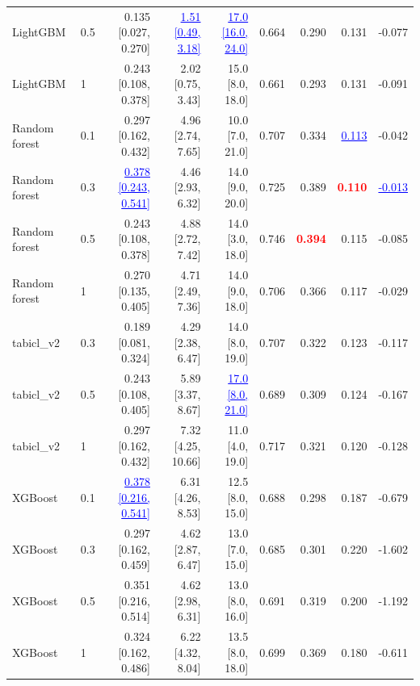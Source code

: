\begin{table}[!htbp]
{\begin{tabular}{llrrrrrrr}
LightGBM & 0.5 & 0.135 [0.027, 0.270] & \textcolor{blue}{\underline{1.51 [0.49, 3.18]}} & \textcolor{blue}{\underline{17.0 [16.0, 24.0]}} & 0.664 & 0.290 & 0.131 & -0.077 \\
LightGBM & 1 & 0.243 [0.108, 0.378] & 2.02 [0.75, 3.43] & 15.0 [8.0, 18.0] & 0.661 & 0.293 & 0.131 & -0.091 \\
Random forest & 0.1 & 0.297 [0.162, 0.432] & 4.96 [2.74, 7.65] & 10.0 [7.0, 21.0] & 0.707 & 0.334 & \textcolor{blue}{\underline{0.113}} & -0.042 \\
Random forest & 0.3 & \textcolor{blue}{\underline{0.378 [0.243, 0.541]}} & 4.46 [2.93, 6.32] & 14.0 [9.0, 20.0] & 0.725 & 0.389 & \textcolor{red}{\textbf{0.110}} & \textcolor{blue}{\underline{-0.013}} \\
Random forest & 0.5 & 0.243 [0.108, 0.378] & 4.88 [2.72, 7.42] & 14.0 [3.0, 18.0] & 0.746 & \textcolor{red}{\textbf{0.394}} & 0.115 & -0.085 \\
Random forest & 1 & 0.270 [0.135, 0.405] & 4.71 [2.49, 7.36] & 14.0 [9.0, 18.0] & 0.706 & 0.366 & 0.117 & -0.029 \\
tabicl\_v2 & 0.3 & 0.189 [0.081, 0.324] & 4.29 [2.38, 6.47] & 14.0 [8.0, 19.0] & 0.707 & 0.322 & 0.123 & -0.117 \\
tabicl\_v2 & 0.5 & 0.243 [0.108, 0.405] & 5.89 [3.37, 8.67] & \textcolor{blue}{\underline{17.0 [8.0, 21.0]}} & 0.689 & 0.309 & 0.124 & -0.167 \\
tabicl\_v2 & 1 & 0.297 [0.162, 0.432] & 7.32 [4.25, 10.66] & 11.0 [4.0, 19.0] & 0.717 & 0.321 & 0.120 & -0.128 \\
XGBoost & 0.1 & \textcolor{blue}{\underline{0.378 [0.216, 0.541]}} & 6.31 [4.26, 8.53] & 12.5 [8.0, 15.0] & 0.688 & 0.298 & 0.187 & -0.679 \\
XGBoost & 0.3 & 0.297 [0.162, 0.459] & 4.62 [2.87, 6.47] & 13.0 [7.0, 15.0] & 0.685 & 0.301 & 0.220 & -1.602 \\
XGBoost & 0.5 & 0.351 [0.216, 0.514] & 4.62 [2.98, 6.31] & 13.0 [8.0, 16.0] & 0.691 & 0.319 & 0.200 & -1.192 \\
XGBoost & 1 & 0.324 [0.162, 0.486] & 6.22 [4.32, 8.04] & 13.5 [8.0, 18.0] & 0.699 & 0.369 & 0.180 & -0.611 \\
\bottomrule
\end{tabular}
}
\end{table}
